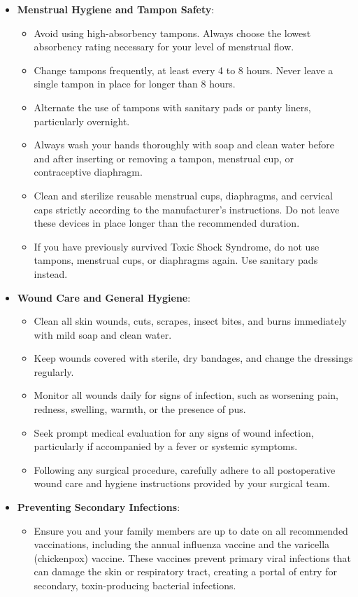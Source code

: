 \begin{itemize}
    \item \textbf{Menstrual Hygiene and Tampon Safety}:
    \begin{itemize}
        \item Avoid using high-absorbency tampons. Always choose the lowest absorbency rating necessary for your level of menstrual flow.
        \item Change tampons frequently, at least every 4 to 8 hours. Never leave a single tampon in place for longer than 8 hours.
        \item Alternate the use of tampons with sanitary pads or panty liners, particularly overnight.
        \item Always wash your hands thoroughly with soap and clean water before and after inserting or removing a tampon, menstrual cup, or contraceptive diaphragm.
        \item Clean and sterilize reusable menstrual cups, diaphragms, and cervical caps strictly according to the manufacturer's instructions. Do not leave these devices in place longer than the recommended duration.
        \item If you have previously survived Toxic Shock Syndrome, do not use tampons, menstrual cups, or diaphragms again. Use sanitary pads instead.
    \end{itemize}
    \item \textbf{Wound Care and General Hygiene}:
    \begin{itemize}
        \item Clean all skin wounds, cuts, scrapes, insect bites, and burns immediately with mild soap and clean water.
        \item Keep wounds covered with sterile, dry bandages, and change the dressings regularly.
        \item Monitor all wounds daily for signs of infection, such as worsening pain, redness, swelling, warmth, or the presence of pus.
        \item Seek prompt medical evaluation for any signs of wound infection, particularly if accompanied by a fever or systemic symptoms.
        \item Following any surgical procedure, carefully adhere to all postoperative wound care and hygiene instructions provided by your surgical team.
    \end{itemize}
    \item \textbf{Preventing Secondary Infections}:
    \begin{itemize}
        \item Ensure you and your family members are up to date on all recommended vaccinations, including the annual influenza vaccine and the varicella (chickenpox) vaccine. These vaccines prevent primary viral infections that can damage the skin or respiratory tract, creating a portal of entry for secondary, toxin-producing bacterial infections.
    \end{itemize}
\end{itemize}


